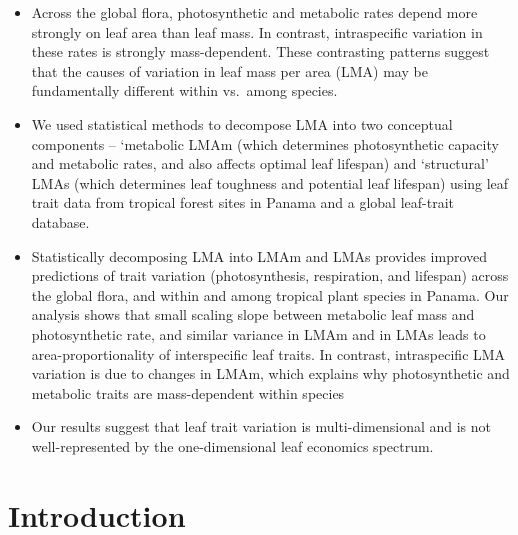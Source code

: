 \documentclass[
  12pt,
  a4paper,
,tablecaptionabove
]{scrartcl}
\begin{document}
\begin{itemize}
\item
  Across the global flora, photosynthetic and metabolic rates depend
  more strongly on leaf area than leaf mass. In contrast, intraspecific
  variation in these rates is strongly mass-dependent. These contrasting
  patterns suggest that the causes of variation in leaf mass per area
  (LMA) may be fundamentally different within vs.~among species.
\item
  We used statistical methods to decompose LMA into two conceptual
  components -- `metabolic LMAm (which determines photosynthetic
  capacity and metabolic rates, and also affects optimal leaf lifespan)
  and `structural' LMAs (which determines leaf toughness and potential
  leaf lifespan) using leaf trait data from tropical forest sites in
  Panama and a global leaf-trait database.
\item
  Statistically decomposing LMA into LMAm and LMAs provides improved
  predictions of trait variation (photosynthesis, respiration, and
  lifespan) across the global flora, and within and among tropical plant
  species in Panama. Our analysis shows that small scaling slope between
  metabolic leaf mass and photosynthetic rate, and similar variance in
  LMAm and in LMAs leads to area-proportionality of interspecific leaf
  traits. In contrast, intraspecific LMA variation is due to changes in
  LMAm, which explains why photosynthetic and metabolic traits are
  mass-dependent within species
\item
  Our results suggest that leaf trait variation is multi-dimensional and
  is not well-represented by the one-dimensional leaf economics
  spectrum.
\end{itemize}

\hypertarget{introduction}{%
\section{Introduction}\label{introduction}}
\end{document}

